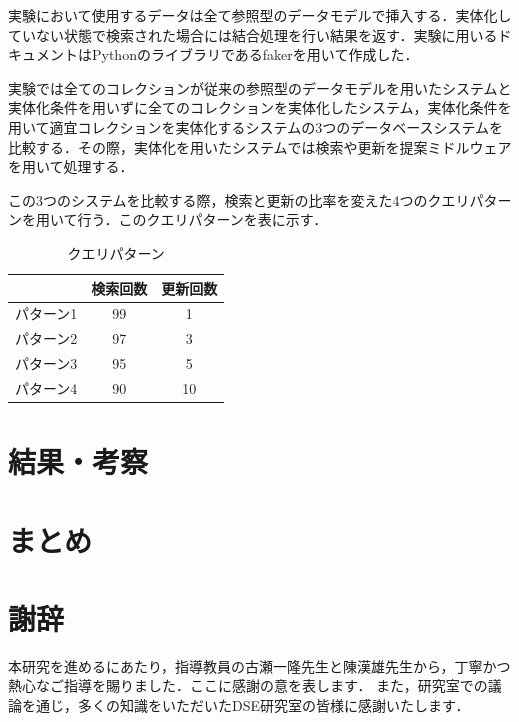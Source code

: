 \documentclass[a4paper,11pt]{ujreport}
\begin{document}
実験において使用するデータは全て参照型のデータモデルで挿入する．実体化していない状態で検索された場合には結合処理を行い結果を返す．実験に用いるドキュメントはPythonのライブラリであるfaker\cite{faker}を用いて作成した．


実験では全てのコレクションが従来の参照型のデータモデルを用いたシステムと実体化条件を用いずに全てのコレクションを実体化したシステム，実体化条件を用いて適宜コレクションを実体化するシステムの3つのデータベースシステムを比較する．その際，実体化を用いたシステムでは検索や更新を提案ミドルウェアを用いて処理する．

この3つのシステムを比較する際，検索と更新の比率を変えた4つのクエリパターンを用いて行う．このクエリパターンを表に示す．
\begin{table}[htb]
  \begin{center}
    \caption{クエリパターン}
		\label{table:experiment_query_pattern}
    \begin{tabular}{|c|c|c|} \hline
        & 検索回数 & 更新回数 \\ \hline
      パターン1 & 99 & 1\\ \hline
      パターン2 & 97 & 3\\ \hline
			パターン3 & 95 & 5\\ \hline
      パターン4 & 90 & 10\\ \hline
    \end{tabular}
  \end{center}
\end{table}

\chapter{結果・考察}
\label{chap:Result}

\chapter{まとめ}
\label{chap:Conclusion}

\chapter*{謝辞}
本研究を進めるにあたり，指導教員の古瀬一隆先生と陳漢雄先生から，丁寧かつ熱心なご指導を賜りました．ここに感謝の意を表します．
また，研究室での議論を通じ，多くの知識をいただいたDSE研究室の皆様に感謝いたします．

\newpage

\renewcommand{\bibname}{参考文献}



\end{document}
